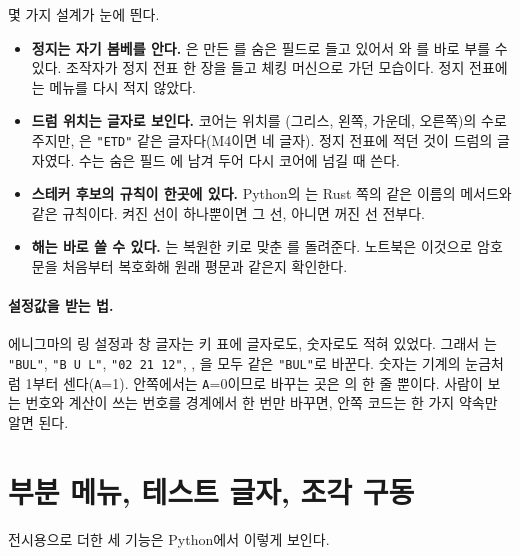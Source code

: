 몇 가지 설계가 눈에 띈다.

\begin{itemize}
\item \textbf{정지는 자기 봄베를 안다.} 은 만든 를 숨은 필드로 들고 있어서
와 를 바로 부를 수 있다. 조작자가 정지 전표 한 장을 들고 체킹 머신으로
가던 모습이다. 정지 전표에는 메뉴를 다시 적지 않았다.
\item \textbf{드럼 위치는 글자로 보인다.} 코어는 위치를 (그리스, 왼쪽, 가운데, 오른쪽)의 수로 주지만,
은 \texttt{"ETD"} 같은 글자다(M4이면 네 글자). 정지 전표에 적던 것이 드럼의 글자였다.
수는 숨은 필드 에 남겨 두어 다시 코어에 넘길 때 쓴다.
\item \textbf{스테커 후보의 규칙이 한곳에 있다.} Python의 는 Rust 쪽의
같은 이름의 메서드와 같은 규칙이다. 켜진 선이 하나뿐이면 그 선, 아니면 꺼진 선 전부다.
\item \textbf{해는 바로 쓸 수 있다.} 는 복원한 키로 맞춘 를 돌려준다.
노트북은 이것으로 암호문을 처음부터 복호화해 원래 평문과 같은지 확인한다.
\end{itemize}

\paragraph{설정값을 받는 법.} 에니그마의 링 설정과 창 글자는 키 표에 글자로도, 숫자로도 적혀 있었다. 그래서
는 \texttt{"BUL"}, \texttt{"B U L"}, \texttt{"02 21 12"}, \code{[2, 21, 12]},
\code{["B", "U", "L"]}을 모두 같은 \texttt{"BUL"}로 바꾼다. 숫자는 기계의 눈금처럼 1부터 센다(\texttt{A}=1).
안쪽에서는 \texttt{A}=0이므로 바꾸는 곳은 의 한 줄 뿐이다. 사람이 보는
번호와 계산이 쓰는 번호를 경계에서 한 번만 바꾸면, 안쪽 코드는 한 가지 약속만 알면 된다.

\section{부분 메뉴, 테스트 글자, 조각 구동}\label{sec:py-exhibit}

전시용으로 더한 세 기능은 Python에서 이렇게 보인다.


